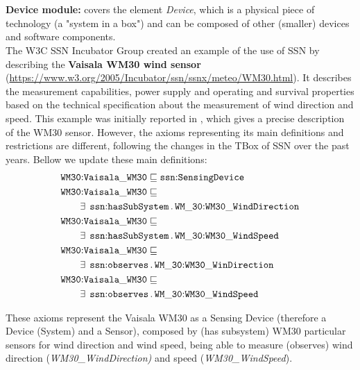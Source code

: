\documentclass{sig-alternate-05-2015}
\newcommand{\erestr}[2]{\exists\;\,{\tt #1}\,.\,{\tt #2}}
\begin{document}
\\\\\textbf{Device module:} covers the element \textit{Device}, which is a physical piece of technology (a "system in a box") and can be composed of other (smaller) devices and software components.\\
 
The W3C SSN Incubator Group created an example of the use of SSN by describing the \textbf{Vaisala WM30 wind sensor} (\url{https://www.w3.org/2005/Incubator/ssn/ssnx/meteo/WM30.html}). It describes the measurement capabilities, power supply and operating and survival properties based on the technical specification about the measurement of wind direction and speed. This example was initially reported in \cite{Compton2009}, which gives a precise description of the WM30 sensor. However, the axioms representing its main definitions and restrictions are different, following the changes in the TBox of SSN over the past years. Bellow we update these main definitions:
\begin{align*}
  \begin{aligned}
	&\node{WM30}{Vaisala\-\_WM30} \sqsubseteq \node{ssn}{SensingDevice}\\
	&\node{WM30}{Vaisala\-\_WM30} \sqsubseteq\\
	&\qquad\erestr{\node{ssn}{hasSubSystem}}{\node{WM\_30}{WM30\-\_Wind\-Direction}}\\
	&\node{WM30}{Vaisala\-\_WM30} \sqsubseteq\\
	&\qquad\erestr{\node{ssn}{hasSubSystem}}{\node{WM\_30}{WM30\-\_WindSpeed}}\\	
	&\node{WM30}{Vaisala\-\_WM30} \sqsubseteq\\
	&\qquad\erestr{\node{ssn}{observes}}{\node{WM\_30}{WM30\-\_WinDirection}}\\
	&\node{WM30}{Vaisala\-\_WM30} \sqsubseteq\\
	&\qquad\erestr{\node{ssn}{observes}}{\node{WM\_30}{WM30\-\_WindSpeed}}\\
  \end{aligned}\\
\end{align*}

These axioms represent the Vaisala WM30 as a Sensing Device (therefore a Device (System) and a Sensor), composed by (has subsystem) WM30 particular sensors for wind direction and wind speed, being able to measure (observes) wind direction (\textit{WM30\-\_Wind\-Direction)} and speed (\textit{WM30\-\_WindSpeed}). 
\end{document}

